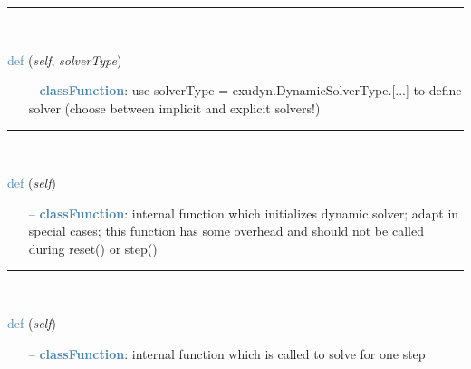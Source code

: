 \begin{itemize}[leftmargin=1.4cm]
%
\noindent\rule{8cm}{0.75pt}\vspace{1pt} \\ 
\begin{flushleft}
\noindent \textcolor{steelblue}{def {\bf {}}}\label{sec:artificialIntelligence:OpenAIGymInterfaceEnv:SetSolver}
({\it self}, {\it solverType})
\end{flushleft}
\setlength{\itemindent}{0.7cm}
\begin{itemize}[leftmargin=0.7cm]
\item[--]\textcolor{steelblue}{\bf classFunction}: use solverType = exudyn.DynamicSolverType.[...] to define solver (choose between implicit and explicit solvers!)
\vspace{12pt}\end{itemize}
%
\noindent\rule{8cm}{0.75pt}\vspace{1pt} \\ 
\begin{flushleft}
\noindent \textcolor{steelblue}{def {\bf {}}}\label{sec:artificialIntelligence:OpenAIGymInterfaceEnv:PreInitializeSolver}
({\it self})
\end{flushleft}
\setlength{\itemindent}{0.7cm}
\begin{itemize}[leftmargin=0.7cm]
\item[--]\textcolor{steelblue}{\bf classFunction}: internal function which initializes dynamic solver; adapt in special cases; this function has some overhead and should not be called during reset() or step()
\vspace{12pt}\end{itemize}
%
\noindent\rule{8cm}{0.75pt}\vspace{1pt} \\ 
\begin{flushleft}
\noindent \textcolor{steelblue}{def {\bf {}}}\label{sec:artificialIntelligence:OpenAIGymInterfaceEnv:IntegrateStep}
({\it self})
\end{flushleft}
\setlength{\itemindent}{0.7cm}
\begin{itemize}[leftmargin=0.7cm]
\item[--]\textcolor{steelblue}{\bf classFunction}: internal function which is called to solve for one step

\end{itemize}
\end{itemize}
